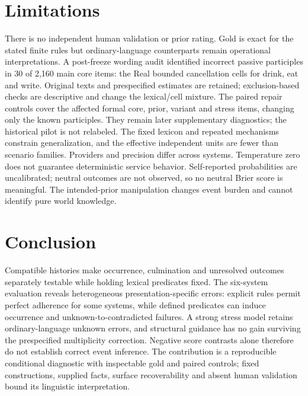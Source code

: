 \documentclass[sigconf,anonymous,review]{acmart}
\begin{document}
\balance
\section{Limitations}
There is no independent human validation or prior rating. Gold is exact for the stated finite rules but ordinary-language counterparts remain operational interpretations. A post-freeze wording audit identified incorrect passive participles in 30 of 2,160 main core items: the Real bounded cancellation cells for drink, eat and write. Original texts and prespecified estimates are retained; exclusion-based checks are descriptive and change the lexical/cell mixture. The paired repair controls cover the affected formal core, prior, variant and stress items, changing only the known participles. They remain later supplementary diagnostics; the historical pilot is not relabeled. The fixed lexicon and repeated mechanisms constrain generalization, and the effective independent units are fewer than scenario families. Providers and precision differ across systems. Temperature zero does not guarantee deterministic service behavior. Self-reported probabilities are uncalibrated; neutral outcomes are not observed, so no neutral Brier score is meaningful. The intended-prior manipulation changes event burden and cannot identify pure world knowledge. 

\section{Conclusion}
Compatible histories make occurrence, culmination and unresolved outcomes separately testable while holding lexical predicates fixed. The six-system evaluation reveals heterogeneous presentation-specific errors: explicit rules permit perfect adherence for some systems, while defined predicates can induce occurrence and unknown-to-contradicted failures. A strong stress model retains ordinary-language unknown errors, and structural guidance has no gain surviving the prespecified multiplicity correction. Negative score contrasts alone therefore do not establish correct event inference. The contribution is a reproducible conditional diagnostic with inspectable gold and paired controls; fixed constructions, supplied facts, surface recoverability and absent human validation bound its linguistic interpretation.
\end{document}
